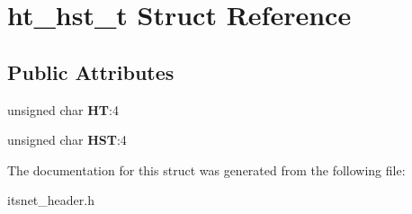 \hypertarget{structht__hst__t}{\section{ht\-\_\-hst\-\_\-t \-Struct \-Reference}
\label{structht__hst__t}
}
\subsection*{\-Public \-Attributes}
\begin{DoxyCompactItemize}
\item 
\hypertarget{structht__hst__t_a53588e1888127d99b8348185f2926918}{unsigned char {\bfseries \-H\-T}\-:4}\label{structht__hst__t_a53588e1888127d99b8348185f2926918}

\item 
\hypertarget{structht__hst__t_a265835a409bafe394c6d9fced6179791}{unsigned char {\bfseries \-H\-S\-T}\-:4}\label{structht__hst__t_a265835a409bafe394c6d9fced6179791}

\end{DoxyCompactItemize}


\-The documentation for this struct was generated from the following file\-:\begin{DoxyCompactItemize}
\item 
itsnet\-\_\-header.\-h\end{DoxyCompactItemize}
